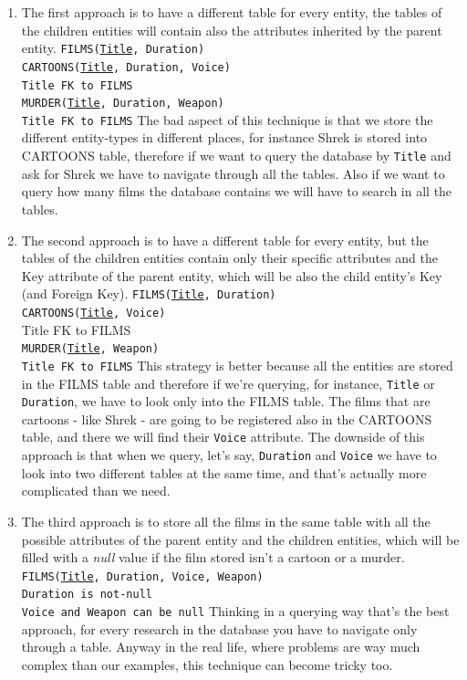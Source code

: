 \documentclass[class=book, crop=false, oneside]{standalone}
\newcommand\tab[1][1cm]{\hspace*{#1}}
\begin{document}
\begin{enumerate}
	\item The first approach is to have a different table for every entity, the tables of the children entities will contain also the attributes inherited by the parent entity.
	\vskip 5pt
	\texttt{FILMS(\underline{Title}, Duration)}\\
	\texttt{CARTOONS(\underline{Title}, Duration, Voice)}\\
	  	\tab[.8cm] \texttt{Title FK to FILMS}\\
	\texttt{MURDER(\underline{Title}, Duration, Weapon)}\\
		\tab[.8cm] \texttt{Title FK to FILMS}
	\vskip 5pt
	The bad aspect of this technique is that we store the different entity-types in different places, for instance Shrek is stored into CARTOONS table, therefore if we want to query the database by \texttt{Title} and ask for Shrek we have to navigate through all the tables. Also if we want to query how many films the database contains we will have to search in all the tables.
	\item The second approach is to have a different table for every entity, but the tables of the children entities contain only their specific attributes and the Key attribute of the parent entity, which will be also the child entity's Key (and Foreign Key).
	\vskip 5pt
	\texttt{FILMS(\underline{Title}, Duration)}\\
	\texttt{CARTOONS(\underline{Title}, Voice)}\\
	  	\tab[.8cm] Title FK to FILMS\\
	\texttt{MURDER(\underline{Title}, Weapon)}\\
		\tab[.8cm] \texttt{Title FK to FILMS}
	\vskip 5pt
	This strategy is better because all the entities are stored in the FILMS table and therefore if we're querying, for instance, \texttt{Title} or \texttt{Duration}, we have to look only into the FILMS table. The films that are cartoons - like Shrek - are going to be registered also in the CARTOONS table, and there we will find their \texttt{Voice} attribute.
	The downside of this approach is that when we query, let's say, \texttt{Duration} and \texttt{Voice} we have to look into two different tables at the same time, and that's actually more complicated than we need.
	\item The third approach is to store all the films in the same table with all the possible attributes of the parent entity and the children entities, which will be filled with a \emph{null} value if the film stored isn't a cartoon or a murder.
	\vskip 5pt
	\texttt{FILMS(\underline{Title}, Duration, Voice, Weapon)}\\
	\tab[.4cm] \texttt{Duration is not-null}\\
	\tab[.4cm] \texttt{Voice and Weapon can be null}
	\vskip 5pt
	Thinking in a querying way that's the best approach, for every research in the database you have to navigate only through a table. Anyway in the real life, where problems are way much complex than our examples, this technique can become tricky too.
\end{enumerate}
\end{document}
